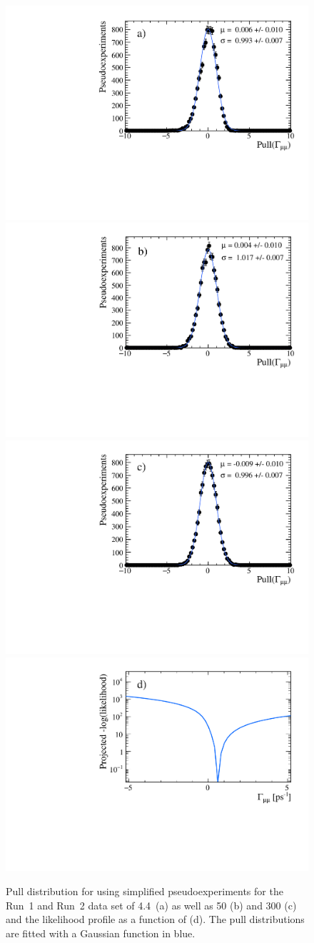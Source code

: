 
\begin{figure}[tbp]
    \centering
       \includegraphics[width=0.49 \textwidth]{./Figs/LifetimeMeasurement/CKM_simple_gamma_pull.pdf}
     \includegraphics[width= 0.49 \textwidth]{./Figs/LifetimeMeasurement/50fb_gamma_pull.pdf}
      \includegraphics[width=0.49 \textwidth]{./Figs/LifetimeMeasurement/300fb_simple_gamma_pull.pdf}
        \includegraphics[width= 0.49 \textwidth]{./Figs/LifetimeMeasurement/Gamma_LL.pdf}  
  \caption{Pull distribution for \Gmumu using simplified pseudoexperiments for the Run~1 and Run~2 data set of 4.4~\fb (a) as well as 50 (b) and 300 (c) \fb and the likelihood profile as a function of \Gmumu (d).  The pull distributions are fitted with a Gaussian function in blue.}%
    \label{fig:gammapulls}
\end{figure}


